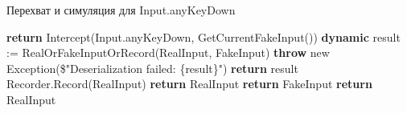 \begin{algorithm}
	\caption{Перехват и симуляция для Input.anyKeyDown}\label{alg:input}
	\begin{algorithmic}
		\State \textbf{return} Intercept(Input.anyKeyDown, 
		\State GetCurrentFakeInput())
		\EndProcedure
		\State \textbf{dynamic} result := RealOrFakeInputOrRecord(RealInput, FakeInput)
		\State \textbf{throw} new Exception(\$"Deserialization failed: \{result\}")
		\EndIf
		\State \textbf{return} result
		\EndProcedure
		\State Recorder.Record(RealInput)
		\State \textbf{return} RealInput
		\State \textbf{return} FakeInput
		\Else
		\State \textbf{return} RealInput
		\EndIf
		\EndProcedure
	\end{algorithmic}
\end{algorithm}